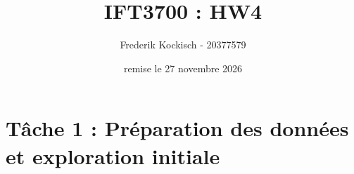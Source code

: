 \documentclass{article}
\title{IFT3700 : HW4}
\author{Frederik Kockisch - 20377579}
\date{remise le 27 novembre 2026}
\begin{document}
\maketitle
\section{Tâche 1 : Préparation des données et exploration initiale}
\end{document}
